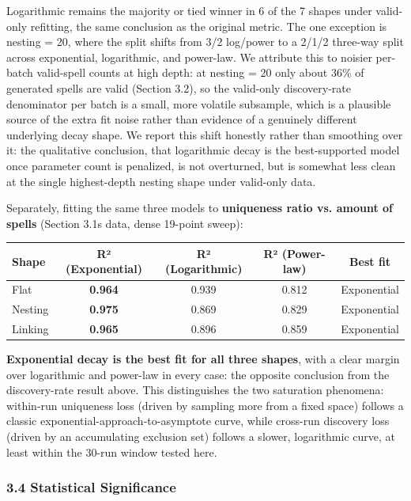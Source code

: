\documentclass[
  10pt,
  twocolumn]{article}
\begin{document}
Logarithmic remains the majority or tied winner in 6 of the 7 shapes
under valid-only refitting, the same conclusion as the original metric.
The one exception is nesting = 20, where the split shifts from 3/2
log/power to a 2/1/2 three-way split across exponential, logarithmic,
and power-law. We attribute this to noisier per-batch valid-spell counts
at high depth: at nesting = 20 only about 36\% of generated spells are
valid (Section 3.2), so the valid-only discovery-rate denominator per
batch is a small, more volatile subsample, which is a plausible source
of the extra fit noise rather than evidence of a genuinely different
underlying decay shape. We report this shift honestly rather than
smoothing over it: the qualitative conclusion, that logarithmic decay is
the best-supported model once parameter count is penalized, is not
overturned, but is somewhat less clean at the single highest-depth
nesting shape under valid-only data.

Separately, fitting the same three models to \textbf{uniqueness ratio
vs. amount of spells} (Section 3.1\textquotesingle s data, dense
19-point sweep):

\begin{table}[t]
\centering
\begin{tabular}{@{}lcccc@{}}
\toprule
Shape & R² (Exponential) & R² (Logarithmic) & R² (Power-law) & Best
fit \\
\midrule
Flat & \textbf{0.964} & 0.939 & 0.812 & Exponential \\
Nesting & \textbf{0.975} & 0.869 & 0.829 & Exponential \\
Linking & \textbf{0.965} & 0.896 & 0.859 & Exponential \\
\bottomrule
\end{tabular}
\end{table}

\textbf{Exponential decay is the best fit for all three shapes}, with a
clear margin over logarithmic and power-law in every case: the opposite
conclusion from the discovery-rate result above. This distinguishes the
two saturation phenomena: within-run uniqueness loss (driven by sampling
more from a fixed space) follows a classic
exponential-approach-to-asymptote curve, while cross-run discovery loss
(driven by an accumulating exclusion set) follows a slower, logarithmic
curve, at least within the 30-run window tested here.

\subsubsection{3.4 Statistical
Significance}\label{34-statistical-significance}
\end{document}
